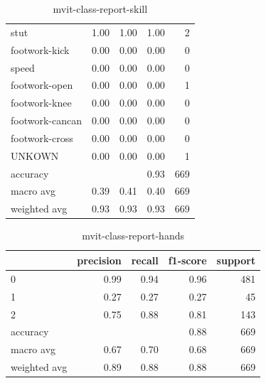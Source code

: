 \begin{table}[h!]
\begin{tabular}{|l|r|r|r|r|}
                stut &      1.00 &     1.00 &     1.00 &        2 \\
       footwork-kick &      0.00 &     0.00 &     0.00 &        0 \\
               speed &      0.00 &     0.00 &     0.00 &        0 \\
       footwork-open &      0.00 &     0.00 &     0.00 &        1 \\
       footwork-knee &      0.00 &     0.00 &     0.00 &        0 \\
     footwork-cancan &      0.00 &     0.00 &     0.00 &        0 \\
      footwork-cross &      0.00 &     0.00 &     0.00 &        0 \\
              UNKOWN &      0.00 &     0.00 &     0.00 &        1 \\
        \hline
            accuracy &           &          &     0.93 &      669 \\
           macro avg &      0.39 &     0.41 &     0.40 &      669 \\
        weighted avg &      0.93 &     0.93 &     0.93 &      669 \\
         \hline
    \end{tabular}
    \caption[Skill class report]{mvit-class-report-skill}
    \label{tbl:mvit-class-report-skill}
\end{table}

\begin{table}[h!]
    \begin{tabular}{|l|r|r|r|r|}
                \hline & precision &   recall & f1-score &  support \\ \hline
                0 &      0.99 &     0.94 &     0.96 &      481 \\
                1 &      0.27 &     0.27 &     0.27 &       45 \\
                2 &      0.75 &     0.88 &     0.81 &      143 \\ \hline
         accuracy &           &          &     0.88 &      669 \\
        macro avg &      0.67 &     0.70 &     0.68 &      669 \\
     weighted avg &      0.89 &     0.88 &     0.88 &      669 \\
         \hline
    \end{tabular}
    \caption[Hands class report]{mvit-class-report-hands}
    \label{tbl:mvit-class-report-hands}
\end{table}

